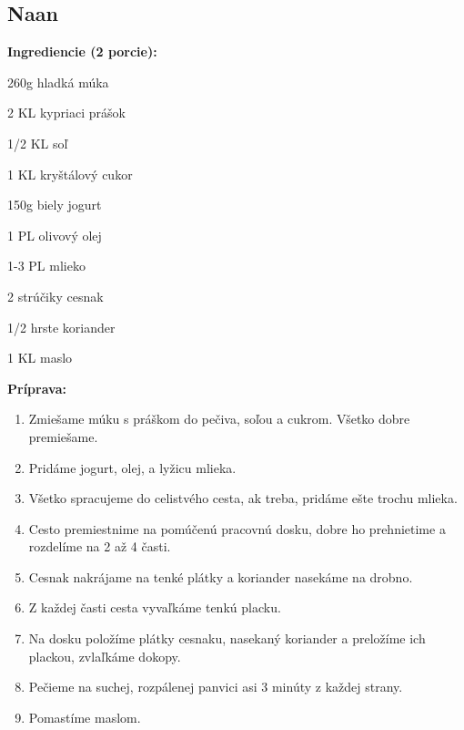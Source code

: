 \setcounter{step}{0}

\subsection{ Naan }

\begin{ingredient}
  
  \def\portions{  }
  \textbf{ {\normalsize Ingrediencie (2 porcie):} }

  \begin{main}
      \item 260g hladká múka
      \item 2 KL kypriaci prášok
      \item 1/2 KL soľ
      \item 1 KL kryštálový cukor
      \item 150g biely jogurt
      \item 1 PL olivový olej
      \item 1-3 PL mlieko
      \item 2 strúčiky cesnak
      \item 1/2 hrste koriander
      \item 1 KL maslo
  \end{main}
  
\end{ingredient}
\begin{recipe}
\textbf{ {\normalsize Príprava:} }
\begin{enumerate}

  \item{Zmiešame múku s práškom do pečiva, soľou a cukrom. Všetko dobre premiešame.}
  \item{Pridáme jogurt, olej, a lyžicu mlieka.}
  \item{Všetko spracujeme do celistvého cesta, ak treba, pridáme ešte trochu mlieka.}
  \item{Cesto premiestnime na pomúčenú pracovnú dosku, dobre ho prehnietime a rozdelíme na 2 až 4 časti.}
  \item{Cesnak nakrájame na tenké plátky a koriander nasekáme na drobno.}
  \item{Z každej časti cesta vyvaľkáme tenkú placku.}
  \item{Na dosku položíme plátky cesnaku, nasekaný koriander a preložíme ich plackou, zvlaľkáme dokopy.}
  \item{Pečieme na suchej, rozpálenej panvici asi 3 minúty z každej strany.}
  \item{Pomastíme maslom.}

\end{enumerate}
\end{recipe}

\begin{notes}
  
\end{notes}	
\clearpage
